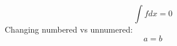 \documentclass[12pt]{article}
\begin{document}
\begin{equation}
  \int f dx =0
\end{equation}
Changing numbered vs unnumered:
    \begin{equation*}
        a = b
    \end{equation*}
\end{document}
